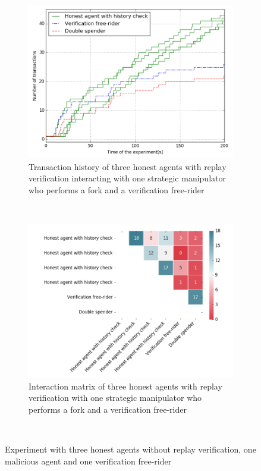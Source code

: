 \begin{figure}[h!]
    \begin{subfigure}{\textwidth}
      \centering
      \includegraphics[width=.7\linewidth]{images/verification_doublespending}
      \caption{Transaction history of three honest agents with replay verification interacting with one strategic manipulator who performs a fork and a verification free-rider}
      \label{fig:verification_doublespending}
    \end{subfigure}\\
    \begin{subfigure}{\textwidth}
      \centering
      \includegraphics[width=.9\linewidth]{images/verification_doublespending_matrix}
      \caption{Interaction matrix of three honest agents with replay verification with one strategic manipulator who performs a fork and a verification free-rider}
      \label{fig:verification_doublespending_matrix}
    \end{subfigure}\\
    \caption{Experiment with three honest agents without replay verification, one malicious agent 
    and one verification free-rider}
    \label{fig:verification_doublespend_combined}
\end{figure}
